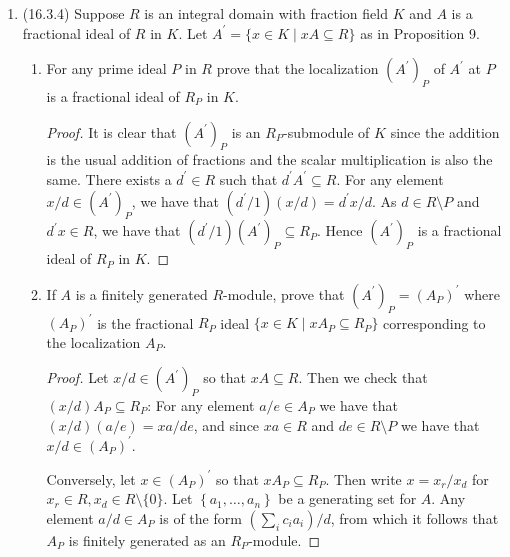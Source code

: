 \documentclass[11pt]{article}
\newcommand{\cbr}[1]{\left\{#1\right\}}
\begin{document}
\begin{enumerate}
\begin{proof}
        Now let $M$ be a finite dimensional vector space, and let $M_i$ be a sequence of decreasing submodules. The dimension of $M_1$ is less than or equal to the dimension of $M$, and so by considering the integer sequence $\dim M_i$ we have that the $M_i$ must terminate eventually: The sequence $\dim M_i$ is monotonic decreasing and hence must converge to some nonnegative integer. By linear algebra it follows that the $M_i$ are isomorphic to each other for $i\geq N$ for $N$ large enough. Hence $M$ is Artinian as needed.
    \end{proof} 
    \item (16.3.4) Suppose $R$ is an integral domain with fraction field $K$ and $A$ is a fractional ideal of $R$ in $K$. Let $A^\prime = \{x\in K\mid xA\subseteq R\}$ as in Proposition 9. \begin{enumerate}
        \item For any prime ideal $P$ in $R$ prove that the localization $(A^\prime)_P$ of $A^\prime$ at $P$ is a fractional ideal of $R_P$ in $K$. \begin{proof}
            It is clear that $(A^\prime)_P$ is an $R_P$-submodule of $K$ since the addition is the usual addition of fractions and the scalar multiplication is also the same. There exists a $d^\prime\in R$ such that $d^\prime A^\prime\subseteq R$. For any element $x/d\in (A^\prime)_P$, we have that $(d^\prime/1)(x/d) = d^\prime x/d$. As $d\in R\setminus P$ and $d^\prime x\in R$, we have that $(d^\prime/1)(A^\prime)_P\subseteq R_P$. Hence $(A^\prime)_P$ is a fractional ideal of $R_P$ in $K$. 
        \end{proof}
        \item If $A$ is a finitely generated $R$-module, prove that $(A^\prime)_P = (A_P)^\prime$ where $(A_P)^\prime$ is the fractional $R_P$ ideal $\{x\in K\mid xA_P\subseteq R_P\}$ corresponding to the localization $A_P$. \begin{proof} Let $x/d\in (A^\prime)_P$ so that $xA\subseteq R$. Then we check that $(x/d)A_P\subseteq R_P$: For any element $a/e\in A_P$ we have that $(x/d)(a/e) = xa/de$, and since $xa\in R$ and $de\in R\setminus P$ we have that $x/d\in (A_P)^\prime$.
        
        Conversely, let $x\in (A_P)^\prime$ so that $xA_P\subseteq R_P$. Then write $x= x_r/x_d$ for $x_r\in R,x_d\in R\setminus\{0\}$. Let $\cbr{a_1,\dots,a_n}$ be a generating set for $A$. Any element $a/d\in A_P$ is of the form $(\sum_i c_ia_i)/d$, from which it follows that $A_P$ is finitely generated as an $R_P$-module.


\end{proof}
\end{enumerate}
\end{enumerate}
\end{document}
